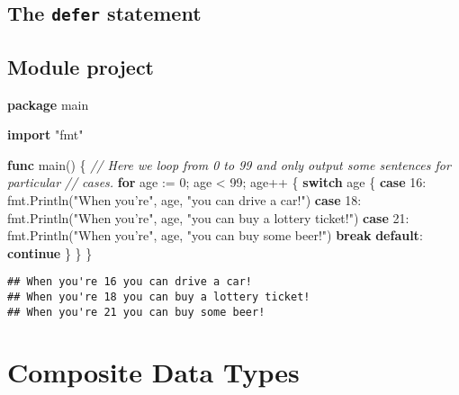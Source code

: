 \documentclass[]{book}
\newenvironment{Shaded}{\begin{snugshade}}{\end{snugshade}}
\newcommand{\CommentTok}[1]{\textcolor[rgb]{0.56,0.35,0.01}{\textit{#1}}}
\newcommand{\DecValTok}[1]{\textcolor[rgb]{0.00,0.00,0.81}{#1}}
\newcommand{\KeywordTok}[1]{\textcolor[rgb]{0.13,0.29,0.53}{\textbf{#1}}}
\newcommand{\NormalTok}[1]{#1}
\newcommand{\StringTok}[1]{\textcolor[rgb]{0.31,0.60,0.02}{#1}}
\begin{document}
\hypertarget{the-defer-statement}{%
\section{\texorpdfstring{The \texttt{defer} statement}{The defer statement}}\label{the-defer-statement}}

\hypertarget{module-project}{%
\section*{Module project}\label{module-project}}

\begin{Shaded}
\begin{Highlighting}[]
\KeywordTok{package}\NormalTok{ main}

\KeywordTok{import} \StringTok{"fmt"}

\KeywordTok{func}\NormalTok{ main() \{}
    \CommentTok{// Here we loop from 0 to 99 and only output some sentences for particular}
    \CommentTok{// cases.}
    \KeywordTok{for}\NormalTok{ age := }\DecValTok{0}\NormalTok{; age < }\DecValTok{99}\NormalTok{; age++ \{}
        \KeywordTok{switch}\NormalTok{ age \{}
        \KeywordTok{case} \DecValTok{16}\NormalTok{:}
\NormalTok{            fmt.Println(}\StringTok{"When you're"}\NormalTok{, age, }\StringTok{"you can drive a car!"}\NormalTok{)}
        \KeywordTok{case} \DecValTok{18}\NormalTok{:}
\NormalTok{            fmt.Println(}\StringTok{"When you're"}\NormalTok{, age, }\StringTok{"you can buy a lottery ticket!"}\NormalTok{)}
        \KeywordTok{case} \DecValTok{21}\NormalTok{:}
\NormalTok{            fmt.Println(}\StringTok{"When you're"}\NormalTok{, age, }\StringTok{"you can buy some beer!"}\NormalTok{)}
            \KeywordTok{break}
        \KeywordTok{default}\NormalTok{:}
            \KeywordTok{continue}
\NormalTok{        \}}
\NormalTok{    \}}
\NormalTok{\}}
\end{Highlighting}
\end{Shaded}

\begin{verbatim}
## When you're 16 you can drive a car!
## When you're 18 you can buy a lottery ticket!
## When you're 21 you can buy some beer!
\end{verbatim}

\hypertarget{composite-data-types}{%
\chapter{Composite Data Types}\label{composite-data-types}}
\end{document}

